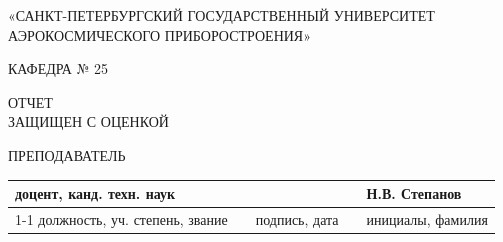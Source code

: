 \newcommand{\Dep}{25}                               %
\newcommand{\teacherPos}{доцент, канд. техн. наук}  %
\newcommand{\teacherName}{Н.В. Степанов}              %

\newcommand{\labNum}{4} %
\newcommand{\labTitle}{Моделирование оптимального приемника дискретных сигналов в канале с аддитивным белым гауссовским шумом} %
\newcommand{\courseName}{Общая теория связи}              %

\newcommand{\studentGroup}{2454}          %
\newcommand{\studentName}{А.С. Калашников}       %
\newcommand{\cityYear}{2026}                 %

\thispagestyle{empty}
\begingroup
\SingleSpacing
\fontsize{12bp}{13.8bp}\selectfont
\setlength{\parindent}{0pt}
\setlength{\parskip}{0pt}
\setlength{\tabcolsep}{0pt}
\renewcommand{\arraystretch}{1}

{\centering
{}\par
{}\par
{\fontsize{10bp}{11.5bp}\selectfont
«САНКТ-ПЕТЕРБУРГСКИЙ ГОСУДАРСТВЕННЫЙ УНИВЕРСИТЕТ\\
АЭРОКОСМИЧЕСКОГО ПРИБОРОСТРОЕНИЯ»\par}
\vspace{24bp}
КАФЕДРА № \Dep\par}

\vspace{60bp}
ОТЧЕТ\\
ЗАЩИЩЕН С ОЦЕНКОЙ\par
\vspace{6bp}
{\fontsize{12bp}{20.7bp}\selectfont ПРЕПОДАВАТЕЛЬ\par}
\vspace{6bp}
\begin{tabular}{@{}p{162.15bp}p{14.2bp}p{141.05bp}p{13.85bp}p{150.7bp}@{}}%
\centering\teacherPos & & & & \centering\teacherName\tabularnewline
\cline{1-1}\cline{3-3}\cline{5-5}
\centering\fontsize{10bp}{9bp}\selectfont должность, уч. степень, звание & &
\centering\fontsize{10bp}{9bp}\selectfont подпись, дата & &
\centering\fontsize{10bp}{9bp}\selectfont инициалы, фамилия\tabularnewline
\end{tabular}\par

